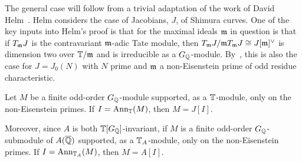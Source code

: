 \documentclass[thesis.tex]{subfiles}
\begin{document}
The general case will follow from a trivial adaptation of the work of David
Helm~\cite{helm:jacobian}. Helm considers the case of Jacobians, $J$, of
Shimura curves. One of the key inputs into Helm's proof is that for the maximal
ideals $\mathfrak{m}$ in question is that if $T_{\mathfrak{m}} J$ is the contravariant $\mathfrak{m}$-adic Tate
module, then $T_{\mathfrak{m}} J/\mathfrak{m} T_{\mathfrak{m}} J\cong J[\mathfrak{m}]^\vee$ is dimension two over $\mathbb{T}/\mathfrak{m}$
and is irreducible as a $G_{\mathbb{Q}}$-module. By~\cite[Prop. 14.2]{mazur:eisenstein},
this is also the case for $J=J_0(N)$ with $N$ prime and $\mathfrak{m}$ a non-Eisenstein
prime of odd residue characteristic.

\begin{theorem}%
    \label{thm:non_eisenstein_kernel_hecke}
    Let $M$ be a finite odd-order $G_{\mathbb{Q}}$-module supported, as a $\mathbb{T}$-module,
    only on the non-Eisenstein primes. If $I=\operatorname{Ann}_{\mathbb{T}}(M)$, then $M=J[I]$.

    Moreover, since $A$ is both $\mathbb{T}[G_{\mathbb{Q}}]$-invariant, if $M$ is a finite
    odd-order $G_{\mathbb{Q}}$-submodule of $A(\overline{\mathbb{Q}})$ supported, as a $\mathbb{T}_A$-module,
    only on the non-Eisenstein primes. If $I=\operatorname{Ann}_{\mathbb{T}_A}(M)$, then $M=A[I]$.
\end{theorem}
\end{document}
